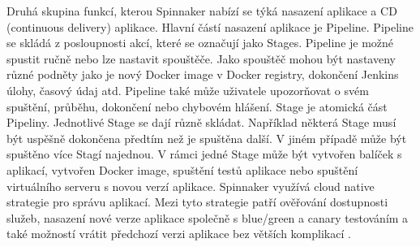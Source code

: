 Druhá skupina funkcí, kterou Spinnaker nabízí se týká nasazení aplikace a CD (continuous delivery) aplikace. Hlavní částí nasazení aplikace je Pipeline. Pipeline se skládá z posloupnosti akcí, které se označují jako Stages. Pipeline je možné spustit ručně nebo lze nastavit spouštěče. Jako spouštěč mohou být nastaveny různé podněty jako je nový Docker image v Docker registry, dokončení Jenkins úlohy, časový údaj atd. Pipeline také může uživatele upozorňovat o svém spuštění, průběhu, dokončení nebo chybovém hlášení. Stage je atomická část Pipeliny. Jednotlivé Stage se dají různě skládat. Například některá Stage musí být uspěšně dokončena předtím než je spuštěna další. V jiném případě může být spuštěno více Stagí najednou. V rámci jedné Stage může být vytvořen balíček s aplikací, vytvořen Docker image, spuštění testů aplikace nebo  spuštění virtuálního serveru s novou verzí aplikace. Spinnaker využívá cloud native strategie pro správu aplikací. Mezi tyto strategie patří ověřování dostupnosti služeb, nasazení nové verze aplikace společně s blue/green a canary testováním a také možností vrátit předchozí verzi aplikace bez větších komplikací \cite{spinnaker}.

